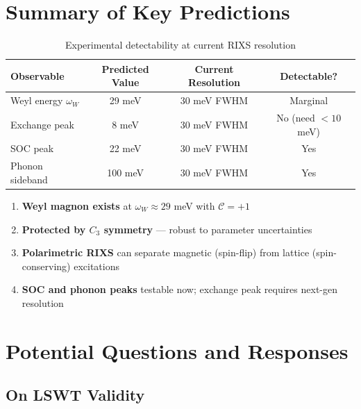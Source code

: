 \documentclass[11pt,letterpaper]{article}
\begin{document}
\section{Summary of Key Predictions}

\begin{table}[h]
\centering
\begin{tabular}{lccc}
\toprule
Observable & Predicted Value & Current Resolution & Detectable? \\
\midrule
Weyl energy $\omega_W$ & 29 meV & 30 meV FWHM & Marginal \\
Exchange peak & 8 meV & 30 meV FWHM & No (need $<10$ meV) \\
SOC peak & 22 meV & 30 meV FWHM & Yes \\
Phonon sideband & 100 meV & 30 meV FWHM & Yes \\
\bottomrule
\end{tabular}
\caption{Experimental detectability at current RIXS resolution}
\end{table}

\begin{keyresult}[title={Main Conclusions}]
\begin{enumerate}
    \item \textbf{Weyl magnon exists} at $\omega_W \approx 29$ meV with $\mathcal{C} = +1$
    \item \textbf{Protected by $C_3$ symmetry} --- robust to parameter uncertainties
    \item \textbf{Polarimetric RIXS} can separate magnetic (spin-flip) from lattice (spin-conserving) excitations
    \item \textbf{SOC and phonon peaks} testable now; exchange peak requires next-gen resolution
\end{enumerate}
\end{keyresult}

\section{Potential Questions and Responses}

\subsection{On LSWT Validity}
\end{document}
